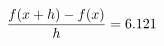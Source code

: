 \documentclass[preview]{standalone}
\begin{document}
\begin{align*}
\special{dvisvgm:raw <g id='unique000'>}\frac{f(x+h)-f(x)}{h} = 6.121\special{dvisvgm:raw </g>}
\end{align*}
\end{document}
